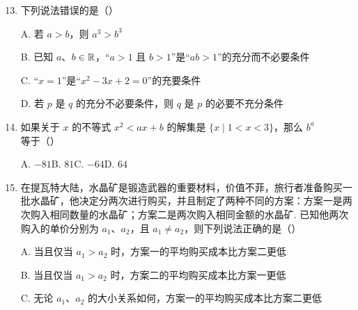 \documentclass[a4paper,11pt]{article}
\begin{document}
\begin{enumerate}
\setcounter{enumi}{12}

\item 下列说法错误的是\mbox{（\quad）}

\keepwithprev
A. 若 $a>b$，则 $a^3>b^3$

B. 已知 $a$、$b\in\mathbb{R}$，“$a>1$ 且 $b>1$”是“$ab>1$”的充分而不必要条件

C. “$x=1$”是“$x^2-3x+2=0$”的充要条件

D. 若 $p$ 是 $q$ 的充分不必要条件，则 $q$ 是 $p$ 的必要不充分条件

\ifanswer
\solbegin
{}
\solend
\fi

\item 如果关于 $x$ 的不等式 $x^2<ax+b$ 的解集是 $\{x\mid1<x<3\}$，那么 $b^a$ 等于\mbox{（\quad）}

\keepwithprev
A. $-81$\qquad B. $81$\qquad C. $-64$\qquad D. $64$

\ifanswer
\solbegin
{}
\solend
\fi

\item 在提瓦特大陆，水晶矿是锻造武器的重要材料，价值不菲，旅行者准备购买一批水晶矿，他决定分两次进行购买，并且制定了两种不同的方案：方案一是两次购入相同数量的水晶矿；方案二是两次购入相同金额的水晶矿. 已知他两次购入的单价分别为 $a_1$、$a_2$，且 $a_1\neq a_2$，则下列说法正确的是\mbox{（\quad）}

\keepwithprev
A. 当且仅当 $a_1>a_2$ 时，方案一的平均购买成本比方案二更低

B. 当且仅当 $a_1>a_2$ 时，方案二的平均购买成本比方案一更低

C. 无论 $a_1$、$a_2$ 的大小关系如何，方案一的平均购买成本比方案二更低


\end{enumerate}
\end{document}
